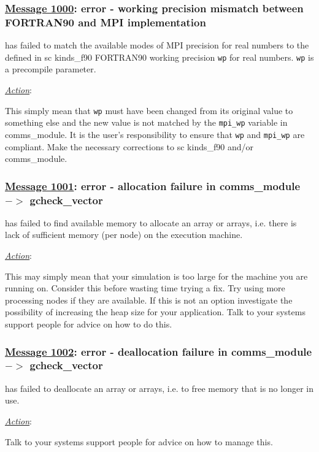 \subsubsection*{\underline{Message 1000}: error - working precision mismatch between FORTRAN90 and MPI implementation}

\D has failed to match the available modes of MPI precision for real
numbers to the defined in {sc kinds\_f90} FORTRAN90 working
precision {\tt wp} for real numbers.  {\tt wp} is a precompile
parameter.

\noindent \underline{\em Action}:

This simply mean that {\tt wp} must have been changed from its
original value to something else and the new value is not matched by
the {\tt mpi\_wp} variable in {\sc comms\_module}.  It is the user's
responsibility to ensure that {\tt wp} and {\tt mpi\_wp} are
compliant.  Make the necessary corrections to {sc kinds\_f90} and/or
{\sc comms\_module}.

\subsubsection*{\underline{Message 1001}: error - allocation failure in comms\_module $->$ gcheck\_vector}

\D has failed to find available memory to allocate an array or
arrays, i.e. there is lack of sufficient memory (per node) on the
execution machine.

\noindent \underline{\em Action}:

This may simply mean that your simulation is too large for the
machine you are running on.  Consider this before wasting time
trying a fix.  Try using more processing nodes if they are
available.  If this is not an option investigate the possibility
of increasing the heap size for your application.  Talk to your
systems support people for advice on how to do this.

\subsubsection*{\underline{Message 1002}: error - deallocation failure in comms\_module $->$ gcheck\_vector}

\D has failed to deallocate an array or arrays, i.e. to free
memory that is no longer in use.

\noindent \underline{\em Action}:

Talk to your systems support people for advice on how to manage
this.

